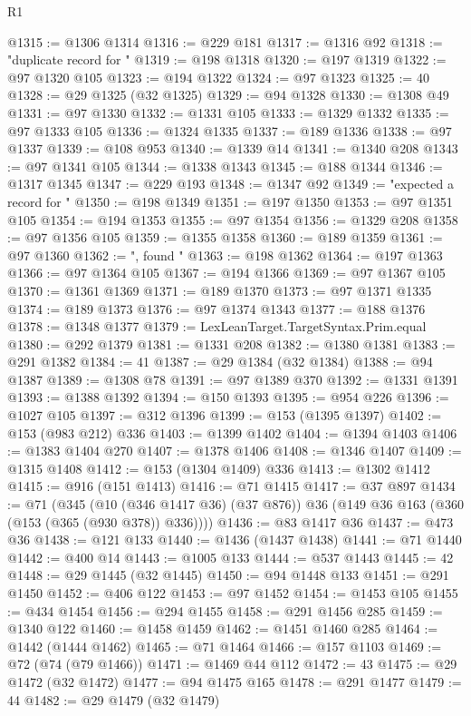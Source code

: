 \begin{lexlean}{R1}
\begin{coremodule}
{{{{{{{{{{{{{{{{{{{{{{{{{{{{{{{{{{{{{{{{{{{{{{{{{{{{{{{{{{{{{{{{{{{{{{{{{{{{{{{{{{{{{{{{{{{{{{{{{{{{{{{{{{{{{{{{{{{{{{{{{{{{{{{{{{{{{{{{{{{{{{{{{{{{{{{{{{{{{{{{{{{{{{{{{{{{{{{{{{{{{{{{{{@1315 := @1306 @1314
@1316 := @229 @181
@1317 := @1316 @92
@1318 := "duplicate record for "
@1319 := @198 @1318
@1320 := @197 @1319
@1322 := @97 @1320 @105
@1323 := @194 @1322
@1324 := @97 @1323
@1325 := 40
@1328 := @29 @1325 (@32 @1325)
@1329 := @94 @1328
@1330 := @1308 @49
@1331 := @97 @1330
@1332 := @1331 @105
@1333 := @1329 @1332
@1335 := @97 @1333 @105
@1336 := @1324 @1335
@1337 := @189 @1336
@1338 := @97 @1337
@1339 := @108 @953
@1340 := @1339 @14
@1341 := @1340 @208
@1343 := @97 @1341 @105
@1344 := @1338 @1343
@1345 := @188 @1344
@1346 := @1317 @1345
@1347 := @229 @193
@1348 := @1347 @92
@1349 := "expected a record for "
@1350 := @198 @1349
@1351 := @197 @1350
@1353 := @97 @1351 @105
@1354 := @194 @1353
@1355 := @97 @1354
@1356 := @1329 @208
@1358 := @97 @1356 @105
@1359 := @1355 @1358
@1360 := @189 @1359
@1361 := @97 @1360
@1362 := ", found "
@1363 := @198 @1362
@1364 := @197 @1363
@1366 := @97 @1364 @105
@1367 := @194 @1366
@1369 := @97 @1367 @105
@1370 := @1361 @1369
@1371 := @189 @1370
@1373 := @97 @1371 @1335
@1374 := @189 @1373
@1376 := @97 @1374 @1343
@1377 := @188 @1376
@1378 := @1348 @1377
@1379 := LexLeanTarget.TargetSyntax.Prim.equal
@1380 := @292 @1379
@1381 := @1331 @208
@1382 := @1380 @1381
@1383 := @291 @1382
@1384 := 41
@1387 := @29 @1384 (@32 @1384)
@1388 := @94 @1387
@1389 := @1308 @78
@1391 := @97 @1389 @370
@1392 := @1331 @1391
@1393 := @1388 @1392
@1394 := @150 @1393
@1395 := @954 @226
@1396 := @1027 @105
@1397 := @312 @1396
@1399 := @153 (@1395 @1397)
@1402 := @153 (@983 @212) @336
@1403 := @1399 @1402
@1404 := @1394 @1403
@1406 := @1383 @1404 @270
@1407 := @1378 @1406
@1408 := @1346 @1407
@1409 := @1315 @1408
@1412 := @153 (@1304 @1409) @336
@1413 := @1302 @1412
@1415 := @916 (@151 @1413)
@1416 := @71 @1415
@1417 := @37 @897
@1434 := @71
    (@345
      (@10 (@346 @1417 @36) (@37 @876))
      @36
      (@149 @36 @163 (@360 (@153 (@365 (@930 @378)) @336))))
@1436 := @83 @1417 @36
@1437 := @473 @36
@1438 := @121 @133
@1440 := @1436 (@1437 @1438)
@1441 := @71 @1440
@1442 := @400 @14
@1443 := @1005 @133
@1444 := @537 @1443
@1445 := 42
@1448 := @29 @1445 (@32 @1445)
@1450 := @94 @1448 @133
@1451 := @291 @1450
@1452 := @406 @122
@1453 := @97 @1452
@1454 := @1453 @105
@1455 := @434 @1454
@1456 := @294 @1455
@1458 := @291 @1456 @285
@1459 := @1340 @122
@1460 := @1458 @1459
@1462 := @1451 @1460 @285
@1464 := @1442 (@1444 @1462)
@1465 := @71 @1464
@1466 := @157 @1103
@1469 := @72 (@74 (@79 @1466))
@1471 := @1469 @44 @112
@1472 := 43
@1475 := @29 @1472 (@32 @1472)
@1477 := @94 @1475 @165
@1478 := @291 @1477
@1479 := 44
@1482 := @29 @1479 (@32 @1479)
}}}}}}}}}}}}}}}}}}}}}}}}}}}}}}}}}}}}}}}}}}}}}}}}}}}}}}}}}}}}}}}}}}}}}}}}}}}}}}}}}}}}}}}}}}}}}}}}}}}}}}}}}}}}}}}}}}}}}}}}}}}}}}}}}}}}}}}}}}}}}}}}}}}}}}}}}}}}}}}}}}}}}}}}}}}}}}}}}}}}}}}}}}
\end{coremodule}
\end{lexlean}
